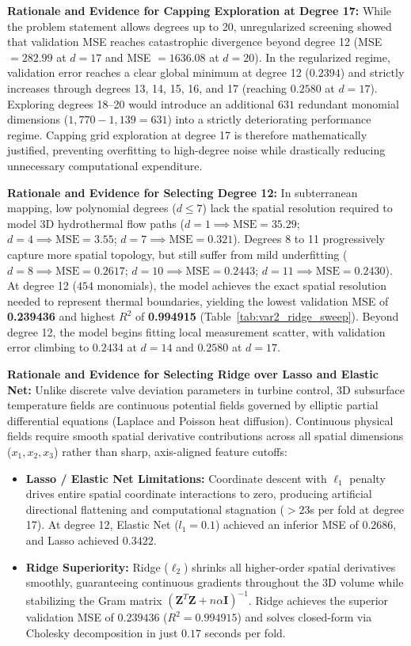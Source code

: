 \documentclass[10pt,a4paper]{article}
\begin{document}
\textbf{Rationale and Evidence for Capping Exploration at Degree 17:} While the problem statement allows degrees up to 20, unregularized screening showed that validation MSE reaches catastrophic divergence beyond degree 12 (MSE $= 282.99$ at $d=17$ and MSE $= 1636.08$ at $d=20$). In the regularized regime, validation error reaches a clear global minimum at degree 12 ($0.2394$) and strictly increases through degrees 13, 14, 15, 16, and 17 (reaching $0.2580$ at $d=17$). Exploring degrees 18--20 would introduce an additional $631$ redundant monomial dimensions ($1{,}770 - 1{,}139 = 631$) into a strictly deteriorating performance regime. Capping grid exploration at degree 17 is therefore mathematically justified, preventing overfitting to high-degree noise while drastically reducing unnecessary computational expenditure.

\textbf{Rationale and Evidence for Selecting Degree 12:} In subterranean mapping, low polynomial degrees ($d \le 7$) lack the spatial resolution required to model 3D hydrothermal flow paths ($d=1 \implies \text{MSE}=35.29$; $d=4 \implies \text{MSE}=3.55$; $d=7 \implies \text{MSE}=0.321$). Degrees 8 to 11 progressively capture more spatial topology, but still suffer from mild underfitting ($d=8 \implies \text{MSE}=0.2617$; $d=10 \implies \text{MSE}=0.2443$; $d=11 \implies \text{MSE}=0.2430$). At degree 12 ($454$ monomials), the model achieves the exact spatial resolution needed to represent thermal boundaries, yielding the lowest validation MSE of \textbf{0.239436} and highest $R^2$ of \textbf{0.994915} (Table~\ref{tab:var2_ridge_sweep}). Beyond degree 12, the model begins fitting local measurement scatter, with validation error climbing to $0.2434$ at $d=14$ and $0.2580$ at $d=17$.

\textbf{Rationale and Evidence for Selecting Ridge over Lasso and Elastic Net:} Unlike discrete valve deviation parameters in turbine control, 3D subsurface temperature fields are continuous potential fields governed by elliptic partial differential equations (Laplace and Poisson heat diffusion). Continuous physical fields require smooth spatial derivative contributions across all spatial dimensions ($x_1, x_2, x_3$) rather than sharp, axis-aligned feature cutoffs:
\begin{itemize}
    \item \textbf{Lasso / Elastic Net Limitations:} Coordinate descent with $\ell_1$ penalty drives entire spatial coordinate interactions to zero, producing artificial directional flattening and computational stagnation ($> 23$s per fold at degree 17). At degree 12, Elastic Net ($l_1=0.1$) achieved an inferior MSE of $0.2686$, and Lasso achieved $0.3422$.
    \item \textbf{Ridge Superiority:} Ridge ($\ell_2$) shrinks all higher-order spatial derivatives smoothly, guaranteeing continuous gradients throughout the 3D volume while stabilizing the Gram matrix $(\mathbf{Z}^T \mathbf{Z} + n\alpha \mathbf{I})^{-1}$. Ridge achieves the superior validation MSE of $0.239436$ ($R^2 = 0.994915$) and solves closed-form via Cholesky decomposition in just $0.17$ seconds per fold.
\end{itemize}
\end{document}
